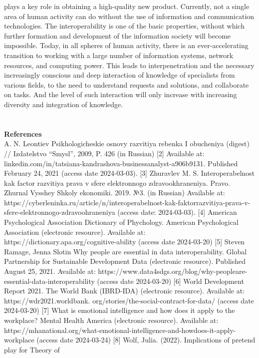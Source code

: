 \documentclass[twocolumn]{article}
\begin{document}
plays a key role in obtaining a high-quality new product.
Currently, not a single area of human activity can
do without the use of information and communication
technologies. The interoperability is one of the basic
properties, without which further formation and development of the information society will become impossible. Today, in all spheres of human activity, there is
an ever-accelerating transition to working with a large
number of information systems, network resources, and
computing power. This leads to interpenetration and the
necessary increasingly conscious and deep interaction of
knowledge of specialists from various fields, to the need
to understand requests and solutions, and collaborate on
tasks. And the level of such interaction will only increase with increasing diversity and integration of knowledge.\\
\\
\\ \textbf{References}\\[1] A. N. Leontiev Psikhologicheskie osnovy razvitiya rebenka I
obucheniya (digest) // Izdatelstvo “Smysl”, 2009, P. 426 (in
Russian)
[2] Available at: linkedin.com/in/tatsiana-kandrashova-businessanalyst-a906b9131. Published February 24, 2021 (access date
2024-03-03).
[3] Zhuravlev M. S. Interoperabelnost kak factor razvitiya prava
v sfere elektronnogo zdravookhraneniya. Pravo. Zhurnal
Vysshey Shkoly ekonomiki. 2019. №3. (in Russian) Available
at: https://cyberleninka.ru/article/n/interoperabelnost-kak-faktorrazvitiya-prava-v-sfere-elektronnogo-zdravoohraneniya (access
date: 2024-03-03).
[4] American Psychological Association Dictionary of Phychology.
American Psychological Association (electronic resource). Available at: https://dictionary.apa.org/cognitive-ability (access date
2024-03-20)
[5] Steven Ramage, Jenna Slotin Why people are essential in
data interoperability. Global Partnership for Sustainable Development Data (electronic resource). Published August 25,
2021. Available at: https://www.data4sdgs.org/blog/why-peopleare-essential-data-interoperability (access date 2024-03-20)
[6] World Development Report 2021. The World Bank (IBRD-IDA)
(electronic resource). Available at: https://wdr2021.worldbank.
org/stories/the-social-contract-for-data/ (access date 2024-03-20)
[7] What is emotional intelligence and how does it apply to the workplace? Mental Health America (electronic resource). Available
at: https://mhanational.org/what-emotional-intelligence-and-howdoes-it-apply-workplace (access date 2024-03-24)
[8] Wolf, Julia. (2022). Implications of pretend play for Theory of
\end{document}

